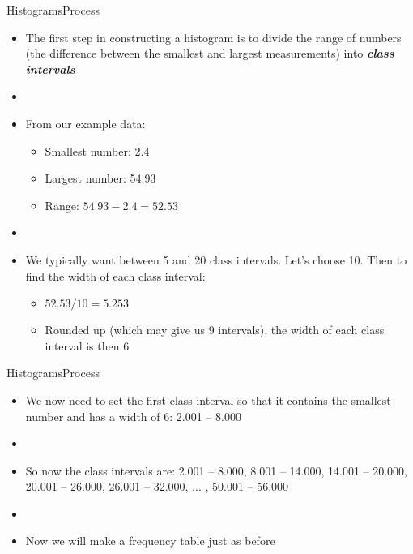 \documentclass[xcolor=dvipsnames]{beamer}
\begin{document}
\begin{frame}{Histograms}{Process}
	\begin{itemize}
		\item The first step in constructing a histogram is to divide the range of numbers (the difference between the smallest and largest measurements) into \textbf{\emph{class intervals}}
		\item[]
		\item From our example data:
		\begin{itemize}
			\item Smallest number: 2.4
			\item Largest number: 54.93
			\item Range: $54.93 - 2.4 = 52.53$
		\end{itemize}	
		\item[]
		\item We typically want between 5 and 20 class intervals. Let's choose 10. Then to find the width of each class interval:
		\begin{itemize}
			\item $52.53 / 10 = 5.253$
			\item Rounded up (which may give us 9 intervals), the width of each class interval is then 6
		\end{itemize}
	\end{itemize}
\end{frame}

\begin{frame}{Histograms}{Process}
	\begin{itemize}
		\item We now need to set the first class interval so that it contains the smallest number and has a width of 6: 2.001 -- 8.000
		\item[]
		\item So now the class intervals are: 2.001 -- 8.000, 8.001 -- 14.000, 14.001 -- 20.000, 20.001 -- 26.000, 26.001 -- 32.000, ... , 50.001 -- 56.000
		\item[]
		\item Now we will make a frequency table just as before 
	\end{itemize}
\end{frame}
\end{document}
